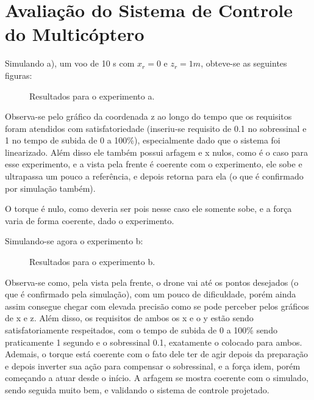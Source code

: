 \documentclass[a4paper]{article}
\begin{document}
	\section{Avalia\c{c}\~ao do Sistema de Controle do Multic\'optero}
	Simulando a), um voo de 10 s com $x_r = 0$ e $z_r = 1 m$, obteve-se as seguintes figuras:
	\begin{figure}[H]
		\centering
		\caption{Resultados para o experimento a.}
	\end{figure}
	Observa-se pelo gr\'afico da coordenada z ao longo do tempo que os requisitos foram
	atendidos com satisfatoriedade (inseriu-se requisito de 0.1 no sobressinal e 1 no tempo de
	subida de 0 a 100\%), especialmente dado que o sistema foi linearizado.
	Al\'em disso ele tamb\'em possui arfagem e x nulos, como \'e o caso para
	esse experimento, e a vista pela frente \'e coerente com o experimento, ele sobe e
	ultrapassa um pouco a refer\^encia, e depois retorna para ela (o que \'e confirmado por
	simula\c{c}\~ao tamb\'em).

	O torque \'e nulo, como deveria ser pois nesse caso ele somente sobe, e a for\c{c}a varia
	de forma coerente, dado o experimento.

	Simulando-se agora o experimento b:
	\begin{figure}[H]
		\centering
		\caption{Resultados para o experimento b.}
	\end{figure}
	Observa-se como, pela vista pela frente, o drone vai at\'e os pontos desejados (o que \'e
	confirmado pela simula\c{c}\~ao), com um pouco de dificuldade, por\'em ainda assim
	consegue chegar com elevada precis\~ao como se pode perceber pelos gr\'aficos de x e z.
	Al\'em disso, os requisitos de ambos os x e o y est\~ao
	sendo satisfatoriamente respeitados, com o tempo de subida de 0 a 100\% sendo praticamente
	1 segundo e o sobressinal 0.1, exatamente o colocado para ambos. Ademais, o torque est\'a
	coerente com o fato dele ter de agir depois da prepara\c{c}\~ao e depois inverter
	sua a\c{c}\~ao para compensar o sobressinal, e a for\c{c}a idem, por\'em come\c{c}ando
	a atuar desde o in\'icio. A arfagem se mostra coerente com o simulado, sendo seguida
	muito bem, e validando o sistema de controle projetado.
\end{document}
